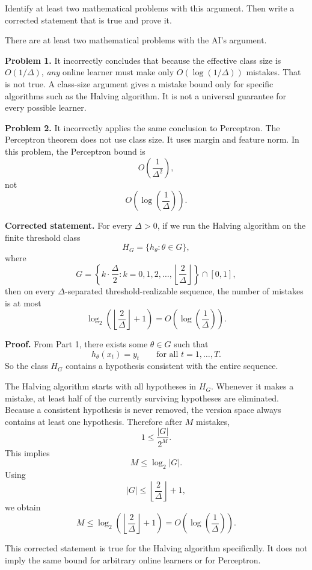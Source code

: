 \documentclass{article}
\begin{document}
Identify at least two mathematical problems with this argument. Then write a
corrected statement that is true and prove it.

\begin{solutionbox}

There are at least two mathematical problems with the AI's argument.

\textbf{Problem 1.}
It incorrectly concludes that because the effective class size is
$O(1/\Delta)$, \emph{any} online learner must make only
$O(\log(1/\Delta))$ mistakes. That is not true. A class-size argument gives a
mistake bound only for specific algorithms such as the Halving algorithm. It is
not a universal guarantee for every possible learner.

\textbf{Problem 2.}
It incorrectly applies the same conclusion to Perceptron. The Perceptron
theorem does not use class size. It uses margin and feature norm. In this
problem, the Perceptron bound is
\[
O\!\left(\frac{1}{\Delta^2}\right),
\]
not
\[
O\!\left(\log\left(\frac{1}{\Delta}\right)\right).
\]

\textbf{Corrected statement.}
For every $\Delta>0$, if we run the Halving algorithm on the finite threshold
class
\[
H_G=\{h_\theta:\theta\in G\},
\]
where
\[
G=
\left\{
k\cdot \frac{\Delta}{2}
:
k=0,1,2,\dots,\left\lfloor \frac{2}{\Delta}\right\rfloor
\right\}
\cap [0,1],
\]
then on every $\Delta$-separated threshold-realizable sequence, the number of
mistakes is at most
\[
\log_2\!\left(\left\lfloor \frac{2}{\Delta}\right\rfloor+1\right)
=
O\!\left(\log\left(\frac{1}{\Delta}\right)\right).
\]

\textbf{Proof.}
From Part 1, there exists some $\theta\in G$ such that
\[
h_\theta(x_t)=y_t
\qquad \text{for all } t=1,\dots,T.
\]
So the class $H_G$ contains a hypothesis consistent with the entire sequence.

The Halving algorithm starts with all hypotheses in $H_G$. Whenever it makes a
mistake, at least half of the currently surviving hypotheses are eliminated.
Because a consistent hypothesis is never removed, the version space always
contains at least one hypothesis. Therefore after $M$ mistakes,
\[
1 \le \frac{|G|}{2^M}.
\]
This implies
\[
M \le \log_2 |G|.
\]
Using
\[
|G| \le \left\lfloor \frac{2}{\Delta}\right\rfloor+1,
\]
we obtain
\[
M
\le
\log_2\!\left(\left\lfloor \frac{2}{\Delta}\right\rfloor+1\right)
=
O\!\left(\log\left(\frac{1}{\Delta}\right)\right).
\]

This corrected statement is true for the Halving algorithm specifically. It
does not imply the same bound for arbitrary online learners or for Perceptron.

\end{solutionbox}
\end{document}

